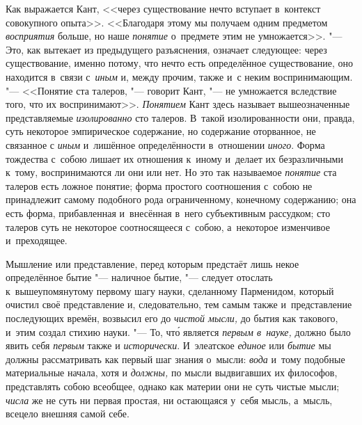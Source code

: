 Как выражается Кант, <<через существование нечто вступает в~контекст
совокупного опыта>>. <<Благодаря этому мы получаем одним предметом
{\em восприятия} больше, но наше {\em понятие} о~предмете этим не
умножается>>. "--- Это, как вытекает из
предыдущего разъяснения, означает следующее: через существование, именно
потому, что нечто есть определённое существование, оно находится в~связи
с~{\em иным} и, между прочим, также и~с неким воспринимающим. "--- <<Понятие
ста талеров, "--- говорит Кант, "--- не умножается вследствие того, что их
воспринимают>>. {\em Понятием} Кант здесь называет вышеозначенные
представляемые {\em изолированно} сто талеров. В~такой изолированности они,
правда, суть некоторое эмпирическое содержание, но содержание оторванное, не
связанное с {\em иным} и~лишённое определённости в~отношении {\em иного}. Форма
тождества с~собою лишает их отношения к~иному и~делает их безразличными к~тому,
воспринимаются ли они или нет. Но это так называемое {\em понятие} ста талеров
есть ложное понятие; форма простого соотношения с~собою не принадлежит самому
подобного рода ограниченному, конечному содержанию; она есть форма,
прибавленная и~внесённая в~него субъективным рассудком; сто талеров суть не
некоторое соотносящееся с~собою, а~некоторое изменчивое и~преходящее.

Мышление или представление, перед которым предстаёт лишь некое определённое бытие
"--- наличное бытие, "--- следует отослать к~вышеупомянутому первому шагу
науки, сделанному Парменидом, который очистил своё представление и,
следовательно, тем самым также и~представление последующих времён, возвысил его
до {\em чистой мысли,} до бытия как такового, и~этим создал стихию науки. "---
То, чт\'{о} является {\em первым в~науке,} должно было явить себя {\em первым} также
и {\em исторически}. И~элеатское {\em единое} или {\em бытие} мы должны
рассматривать как первый шаг знания о~мысли: {\em вода} и~тому подобные материальные
начала, хотя и {\em должны,} по мысли выдвигавших их философов, представлять
собою всеобщее, однако как материи они не суть чистые мысли;
{\em числа} же не суть ни первая простая, ни остающаяся у~себя мысль, а~мысль,
всецело внешняя самой себе.

